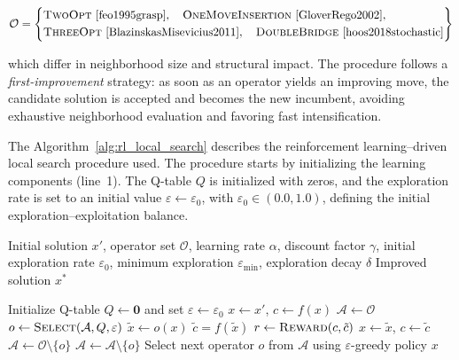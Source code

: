 \documentclass[runningheads]{llncs}
\begin{document}
\begin{equation}
\label{eqops}
\mathcal{O}=
\left\{
\begin{aligned}
&\text{\textsc{TwoOpt}~\cite{feo1995grasp}},\quad
 \text{\textsc{OneMoveInsertion}~\cite{GloverRego2002}},\\
&\text{\textsc{ThreeOpt}~\cite{BlazinskasMisevicius2011}},\quad
 \text{\textsc{DoubleBridge}~\cite{hoos2018stochastic}}
\end{aligned}
\right\}
\end{equation}

\noindent which differ in neighborhood size and structural impact. The procedure follows a \emph{first-improvement} strategy: as soon as an operator yields an improving move, the candidate solution is accepted and becomes the new incumbent, avoiding exhaustive neighborhood evaluation and favoring fast intensification.

The Algorithm~\ref{alg:rl_local_search} describes the reinforcement learning–driven local search procedure used. The procedure starts by initializing the learning components (line~1). The Q-table $Q$ is initialized with zeros, and the exploration rate is set to an initial value $\varepsilon \gets \varepsilon_0$, with $\varepsilon_0 \in (0.0,1.0)$, defining the initial exploration--exploitation balance.


\begin{algorithm}[h]
\caption{RL-driven Local Search}
\label{alg:rl_local_search}
\begin{algorithmic}[1]
\Require Initial solution $x'$, operator set $\mathcal{O}$,
         learning rate $\alpha$, discount factor $\gamma$,
         initial exploration rate $\varepsilon_0$,
         minimum exploration $\varepsilon_{\min}$,
         exploration decay $\delta$
\Ensure Improved solution \(x^*\)

\State Initialize Q-table $Q \gets \mathbf{0}$ and set $\varepsilon \gets \varepsilon_0$ 
\State \(x \gets x'\), \(c \gets f(x)\)
\State \(\mathcal{A} \gets \mathcal{O}\)
\State $o \gets \textsc{Select}(\mathcal{A},Q,\varepsilon)$
   \State $\tilde{x} \gets o(x)$
    \State \(\tilde{c} = f(\tilde{x})\)
      \State $r \gets \textsc{Reward}(c,\tilde{c})$ 
      \State \(x \gets \tilde{x}\), \(c \gets \tilde{c}\)
      \State \(\mathcal{A} \gets \mathcal{O} \setminus \{o\}\) 
    \Else
      \State $\mathcal{A} \gets \mathcal{A} \setminus \{o\}$ 
    \EndIf
    \State Select next operator \(o\) from \(\mathcal{A}\) using $\varepsilon$-greedy policy 
\EndWhile
\State \Return \(x\)
\end{algorithmic}
\end{algorithm}
\end{document}
